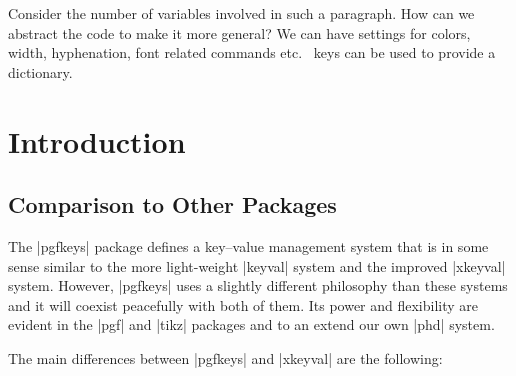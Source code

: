\begin{teXXX}
\def\wavelast#1{%
       \bgroup
       
       \setbox0=\vbox{\fontstore\noindent #1}%
       \setbox1=\vbox{%
            \unvbox0
            \setbox2=\lastbox
            \hbox to 10cm{\hfill\uwave{\unhbox2}\hfill}(*@\label{lin:uwave}@*)%
       }%
       \unvbox1
      \egroup
  }%
\end{teXXX}



Consider the number of variables involved in such a paragraph. How can we abstract the code to make it more general? We can have settings for colors, width, hyphenation, font related commands etc. \pgfname\ keys can be used to provide a dictionary.




\medskip





\section{Introduction}

\subsection{Comparison to Other Packages}

The |pgfkeys| package defines a key--value management system that is in
some sense similar to the more light-weight |keyval| system and the
improved |xkeyval| system. However, |pgfkeys| uses a slightly
different philosophy than these systems and it will coexist peacefully
with both of them. Its power and flexibility are evident in the |pgf|
and |tikz| packages and to an extend our own |phd| system.

The main differences between |pgfkeys| and |xkeyval| are the
following:

